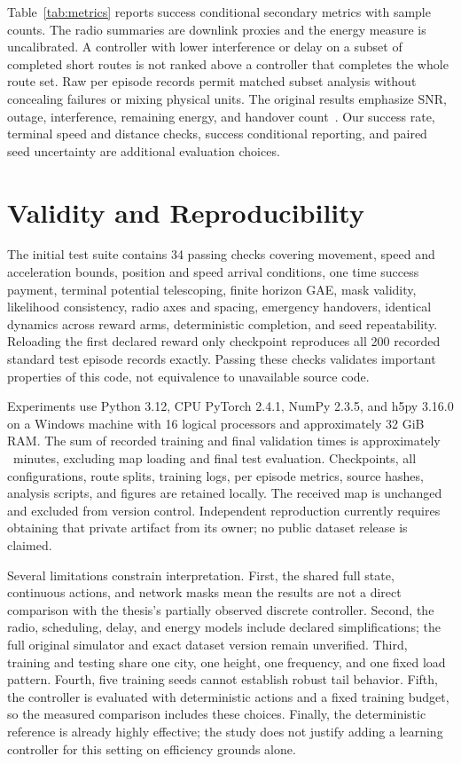 \documentclass[conference]{IEEEtran}
\begin{document}
Table~\ref{tab:metrics} reports success conditional secondary metrics with
sample counts. The radio summaries are downlink proxies and the energy measure
is uncalibrated. A controller with lower interference or delay on a subset of
completed short routes is not ranked above a controller that completes the
whole route set. Raw per episode records permit matched subset analysis without
concealing failures or mixing physical units.
The original results emphasize SNR, outage, interference, remaining energy,
and handover count~\cite[pp.~16--20, Sec.~7, Figs.~5--8]{thesis}.
Our success rate, terminal speed and distance checks, success conditional
reporting, and paired seed uncertainty are additional evaluation choices.

\section{Validity and Reproducibility}
The initial test suite contains 34 passing checks covering movement, speed and
acceleration bounds, position and speed arrival conditions, one time success
payment, terminal potential telescoping, finite horizon GAE, mask validity,
likelihood consistency, radio axes and spacing, emergency handovers, identical
dynamics across reward arms, deterministic completion, and seed repeatability.
Reloading the first declared reward only checkpoint reproduces all 200 recorded
standard test episode records exactly. Passing these checks validates important
properties of this code, not equivalence to unavailable source code.

Experiments use Python 3.12, CPU PyTorch 2.4.1, NumPy 2.3.5, and h5py 3.16.0
on a Windows machine with 16 logical processors and approximately 32 GiB RAM.
The sum of recorded training and final validation times is approximately
\TrainingMinutes\ minutes, excluding map loading and final test evaluation.
Checkpoints, all configurations, route splits, training logs, per episode
metrics, source hashes, analysis scripts, and figures are retained locally.
The received map is unchanged and excluded from version control. Independent
reproduction currently requires obtaining that private artifact from its owner;
no public dataset release is claimed.

Several limitations constrain interpretation. First, the shared full state,
continuous actions, and network masks mean the results are not a direct
comparison with the thesis's partially observed discrete controller. Second,
the radio, scheduling, delay, and energy models include declared simplifications;
the full original simulator and exact dataset version remain unverified.
Third, training and testing share one city, one height, one frequency, and one
fixed load pattern. Fourth, five training seeds cannot establish robust tail
behavior. Fifth, the controller is evaluated with deterministic actions and a
fixed training budget, so the measured comparison includes these choices.
Finally, the deterministic reference is already highly effective; the study
does not justify adding a learning controller for this setting on efficiency
grounds alone.
\end{document}
